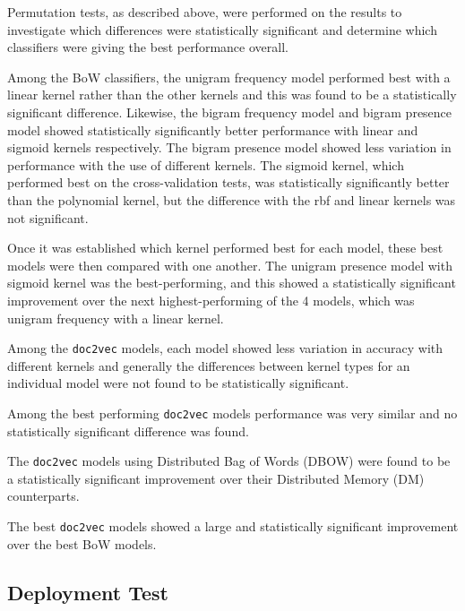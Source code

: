 \documentclass[twocolumn]{article}
\begin{document}
Permutation tests, as described above, were performed on the results to investigate which differences were statistically significant and determine which classifiers were giving the best performance overall.

Among the BoW classifiers, the unigram frequency model performed best with a linear kernel rather than the other kernels and this was found to be a statistically significant difference. Likewise, the bigram frequency model and bigram presence model showed statistically significantly better performance with linear and sigmoid kernels respectively. The bigram presence model showed less variation in performance with the use of different kernels. The sigmoid kernel, which performed best on the cross-validation tests, was statistically significantly better than the polynomial kernel, but the difference with the rbf and linear kernels was not significant.

Once it was established which kernel performed best for each model, these best models were then compared with one another. The unigram presence model with sigmoid kernel was the best-performing, and this showed a statistically significant improvement over the next highest-performing of the 4 models, which was unigram frequency with a linear kernel.

Among the \texttt{doc2vec} models, each model showed less variation in accuracy with different kernels and generally the differences between kernel types for an individual model were not found to be statistically significant.

Among the best performing \texttt{doc2vec} models performance was very similar and no statistically significant difference was found.

The \texttt{doc2vec} models using Distributed Bag of Words (DBOW) were found to be a statistically significant improvement over their Distributed Memory (DM) counterparts.

The best \texttt{doc2vec} models showed a large and statistically significant improvement over the best BoW models.

\subsection{Deployment Test}
\end{document}
